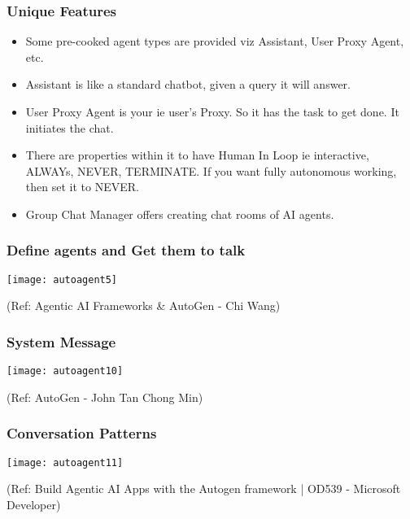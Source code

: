 \begin{frame}[fragile]\frametitle{Unique Features}
  \begin{itemize}
	\item Some pre-cooked agent types are provided viz Assistant, User Proxy Agent, etc.
	\item Assistant is like a standard chatbot, given a query it will answer.
	\item User Proxy Agent is your ie user's Proxy. So it has the task to get done. It initiates the chat.
	\item There are properties within it to have Human In Loop ie interactive, ALWAYs, NEVER, TERMINATE. If you want fully autonomous working, then set it to NEVER.
    \item Group Chat Manager offers creating chat rooms of AI agents.
  \end{itemize}
\end{frame}

\begin{frame}[fragile]\frametitle{Define agents and Get them to talk}
		\begin{center}
		\texttt{[image: autoagent5]}
		\end{center}
		
		{\tiny (Ref: Agentic AI Frameworks \& AutoGen - Chi Wang)}
\end{frame}
  
\begin{frame}[fragile]\frametitle{System Message}
	
	\begin{center}
	\texttt{[image: autoagent10]}
	
			{\tiny (Ref: AutoGen - John Tan Chong Min)}

	\end{center}
	
\end{frame}

\begin{frame}[fragile]\frametitle{Conversation Patterns}
		\begin{center}
		\texttt{[image: autoagent11]}
		\end{center}
		
		{\tiny (Ref: Build Agentic AI Apps with the Autogen framework | OD539 - Microsoft Developer)}
\end{frame}
  
